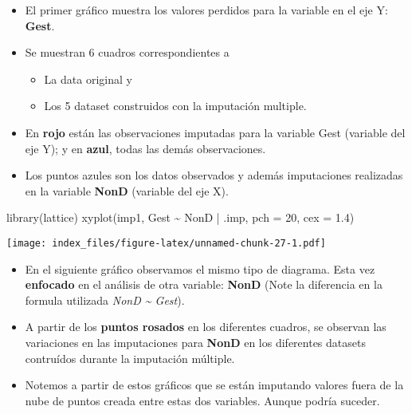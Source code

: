 \documentclass[
]{article}
\newenvironment{Shaded}{\begin{snugshade}}{\end{snugshade}}
\newcommand{\AttributeTok}[1]{\textcolor[rgb]{0.77,0.63,0.00}{#1}}
\newcommand{\DecValTok}[1]{\textcolor[rgb]{0.00,0.00,0.81}{#1}}
\newcommand{\FloatTok}[1]{\textcolor[rgb]{0.00,0.00,0.81}{#1}}
\newcommand{\FunctionTok}[1]{\textcolor[rgb]{0.00,0.00,0.00}{#1}}
\newcommand{\NormalTok}[1]{#1}
\newcommand{\SpecialCharTok}[1]{\textcolor[rgb]{0.00,0.00,0.00}{#1}}
\providecommand{\tightlist}{%
  \setlength{\itemsep}{0pt}\setlength{\parskip}{0pt}}
\begin{document}
\begin{itemize}
\item
  El primer gráfico muestra los valores perdidos para la variable en el
  eje Y: \textbf{Gest}.
\item
  Se muestran 6 cuadros correspondientes a

  \begin{itemize}
  \tightlist
  \item
    La data original y
  \item
    Los 5 dataset construidos con la imputación multiple.
  \end{itemize}
\item
  En \textbf{rojo} están las observaciones imputadas para la variable
  Gest (variable del eje Y); y en \textbf{azul}, todas las demás
  observaciones.
\item
  Los puntos azules son los datos observados y además imputaciones
  realizadas en la variable \textbf{NonD} (variable del eje X).
\end{itemize}

\begin{Shaded}
\begin{Highlighting}[]
\FunctionTok{library}\NormalTok{(lattice)}
\FunctionTok{xyplot}\NormalTok{(imp1, Gest }\SpecialCharTok{\textasciitilde{}}\NormalTok{ NonD }\SpecialCharTok{|}\NormalTok{ .imp, }\AttributeTok{pch =} \DecValTok{20}\NormalTok{, }\AttributeTok{cex =} \FloatTok{1.4}\NormalTok{)}
\end{Highlighting}
\end{Shaded}

\texttt{[image: index\_files/figure-latex/unnamed-chunk-27-1.pdf]}

\begin{itemize}
\item
  En el siguiente gráfico observamos el mismo tipo de diagrama. Esta vez
  \textbf{enfocado} en el análisis de otra variable: \textbf{NonD} (Note
  la diferencia en la formula utilizada \emph{NonD \textasciitilde{}
  Gest}).
\item
  A partir de los \textbf{puntos rosados} en los diferentes cuadros, se
  observan las variaciones en las imputaciones para \textbf{NonD} en los
  diferentes datasets contruídos durante la imputación múltiple.
\item
  Notemos a partir de estos gráficos que se están imputando valores
  fuera de la nube de puntos creada entre estas dos variables. Aunque
  podría suceder.
\end{itemize}
\end{document}
